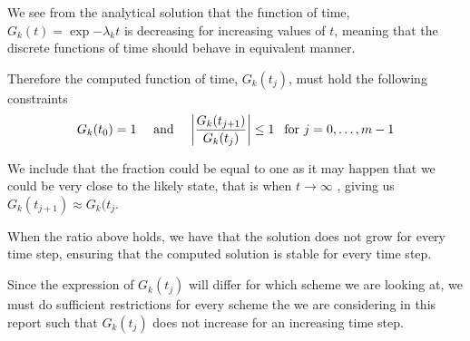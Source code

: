 We see from the analytical solution that the function of time, \(G_k(t) = \exp{-\lambda_k t}\) is decreasing for increasing values of \(t\), meaning that the discrete functions of time should behave in equivalent manner.

Therefore the computed function of time, \(G_k(t_j)\), must hold the following constraints
\[
G_k(t_{0}) = 1 \quad \text{ and }\quad \abs{\frac{G_k(t_{j+1}) } {G_k(t_j) } }\leq 1 \:\:\text{ for } j = 0, \dots,m-1
\]

We include that the fraction could be equal to one as it may happen that we could be very close to the likely state, that is when \(t \to \infty \)  , giving us \( G_k(t_{j+1}) \approx G_k(t_{j} \).

When the ratio above holds, we have that the solution does not grow for every time step, ensuring that the computed solution is stable for every time step.

Since the expression of \(G_k(t_{j})\) will differ for which scheme we are looking at, we must do sufficient restrictions for every scheme the we are considering in this report such that \(G_k(t_{j})\) does not increase for an increasing time step.
